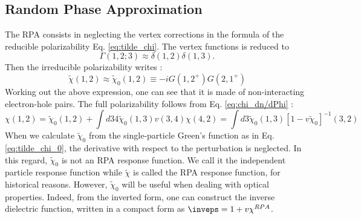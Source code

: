 \subsection{Random Phase Approximation} 
The \acrfull{RPA} consists in neglecting the vertex corrections in the formula of the reducible polarizability Eq. \eqref{eq:tilde_chi}. The vertex functions is reduced to 
\begin{equation}
	\Gamma(1,2;3) \approx \delta(1,2)\delta(1,3).
\end{equation}
Then the irreducible polarizability writes :
\begin{equation}
	\tilde{\chi}(1,2) \approx \tilde{\chi}_0(1,2) \equiv -i G(1,2^+)G(2,1^+) \label{eq:tilde_chi_0}
\end{equation}
Working out the above expression, one can see that it is made of non-interacting electron-hole pairs. The full polarizability follows from Eq. \eqref{eq:chi_dn/dPhi} :
\begin{equation}
	\chi(1,2) = \tilde{\chi}_0(1,2) + \int d34 \tilde{\chi}_0(1,3) v(3,4) \chi(4,2) = \int d3 \tilde{\chi}_0(1,3) \left[ 1 - v \tilde{\chi}_0\right]^{-1}(3,2)
\end{equation}
When we calculate $\tilde{\chi}_0$ from the single-particle Green's function as in Eq. \eqref{eq:tilde_chi_0}, the derivative with respect to the perturbation is neglected. In this regard, $\tilde{\chi}_0$ is not an \acrshort{RPA} response function. We call it the independent particle response function while $\tilde{\chi}$ is called the RPA response function, for historical reasons.
However, $\tilde{\chi}_0$ will be useful when dealing with optical properties. Indeed, from the inverted form, one can construct the inverse dielectric function, written in a compact form as $\inveps = 1+v \chi^{RPA}$.

%
